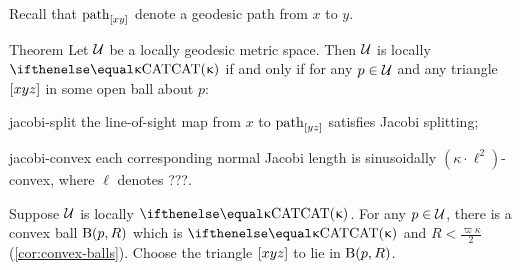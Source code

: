 {Recall that $\mathrm{path}_{[xy]}$ denote a geodesic path from $x$ to $y$.





\begin{thm}{Theorem}\label{thm:jacobi-length}
Let $\mathcal{U}$ be a locally geodesic metric space.
Then $\mathcal{U}$ is locally $\CAT\kappa$ if and only if for any $p\in\spc{U}$ and any triangle $[{x}{y}{z}]$ in some open ball about $p$:



\begin{subthm}{jacobi-split} 
the line-of-sight map from $x$ to $\mathrm{path}_{[yz]}$
satisfies   Jacobi splitting;
\end{subthm}

\begin{subthm}{jacobi-convex}
each corresponding normal Jacobi length is  sinusoidally $(\kappa\cdot\ell^2)$-convex,
where $\ell$ denotes ???.
 \end{subthm}

\end {thm}

Suppose $\mathcal{U}$ is locally $\CAT\kappa$. 
For any $p\in\spc{U}$, there is a convex ball 
$\mathrm{B}{}(p,R)$ which is $\CAT\kappa$ and $R<\tfrac{\varpi\kappa}{2}$ (\ref{cor:convex-balls}). 
Choose the triangle $[{x}{y}{z}]$ to lie in $\mathrm{B}{}(p,R)$.

 
}
